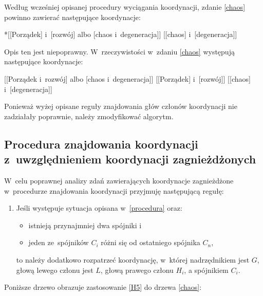 Według wcześniej opisanej procedury wyciągania koordynacji, zdanie \eqref{chaos} powinno zawierać następujące koordynacje:

\begin{exe}
\ex \label{chaos-źle-1}
{*[[Porządek] i~[rozwój] albo [chaos i~degeneracja]]}
\ex \label{chaos-źle-2}
{[[chaos] i~[degeneracja]]}
\end{exe}

Opis ten jest niepoprawny. W~rzeczywistości  w~zdaniu \eqref{chaos} występują następujące koordynacje:

\begin{exe}
\ex \label{chaos-1}
{[[Porządek i~rozwój] albo [chaos i~degeneracja]]}
\ex \label{chaos-2}
{[[Porządek] i~[rozwój]]}
\ex \label{chaos-3}
{[[chaos] i~[degeneracja]]}
\end{exe}

Ponieważ wyżej opisane reguły znajdowania głów członów koordynacji nie zadziałały poprawnie, należy zmodyfikować algorytm.

\subsection{Procedura znajdowania koordynacji z~uwzględnieniem koordynacji zagnieżdżonych} \label{zagnieżdżone}

W~celu poprawnej analizy zdań zawierających koordynacje zagnieżdżone w~procedurze znajdowania koordynacji przyjmuję następującą regułę:

\begin{enumerate}
\item[\namedlabel{H5}{H5}] %
Jeśli występuje sytuacja opisana w~\eqref{procedura} oraz:

\begin{itemize}
\item istnieją przynajmniej dwa spójniki i
\item jeden ze~spójników $C_{i}$ różni się od ostatniego spójnika $C_{n}$,
\end{itemize}

to należy dodatkowo rozpatrzeć koordynację, w~której nadrzędnikiem jest $G$, głową lewego członu jest $L$, głową prawego członu $H_{i}$, a spójnikiem $C_{i}$.
\end{enumerate}

Poniższe drzewo obrazuje zastosowanie \eqref{H5} do drzewa \eqref{chaos}:

